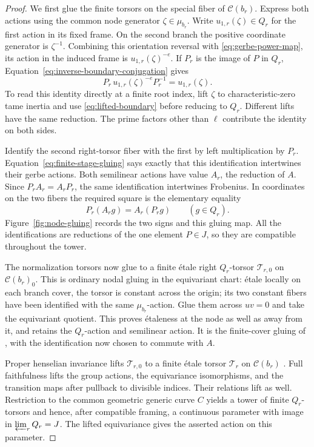 \begin{proof}
We first glue the finite torsors on the special fiber of
$\mathcal C(b_r)$.  Express both actions using the common node
generator $\zeta\in\mu_{b_r}$.  Write $u_{1,r}(\zeta)\in Q_r$ for
the first action in its fixed frame.  On the second branch the
positive coordinate generator is $\zeta^{-1}$.  Combining this
orientation reversal with \eqref{eq:gerbe-power-map}, its action in
the induced frame is $u_{1,r}(\zeta)^{-e}$.  If $P_r$ is the image
of $P$ in $Q_r$, Equation~\eqref{eq:inverse-boundary-conjugation}
gives
\begin{equation}\label{eq:finite-stage-gluing}
       P_r\,u_{1,r}(\zeta)^{-e}P_r^{-1}=u_{1,r}(\zeta).
\end{equation}
To read this identity directly at a finite root index, lift
$\zeta$ to characteristic-zero tame inertia and use
\eqref{eq:lifted-boundary} before reducing to $Q_r$.  Different
lifts have the same reduction.  The prime factors other than $\ell$
contribute the identity on both sides.

Identify the second right-torsor fiber with the first by left
multiplication by $P_r$.  Equation~\eqref{eq:finite-stage-gluing}
says exactly that this identification intertwines their gerbe
actions.  Both semilinear actions have value $A_r$, the reduction of
$A$.  Since $P_rA_r=A_rP_r$, the same identification intertwines
Frobenius.  In coordinates on the two fibers the required square
is the elementary equality
\[
                P_r(A_rg)=A_r(P_rg)\qquad(g\in Q_r).
\]
Figure~\ref{fig:node-gluing} records the two signs and this gluing
map.  All the identifications are reductions of the one element
$P\in J$, so they are compatible throughout the tower.



The normalization torsors now glue to a finite \'etale right
$Q_r$-torsor $\mathcal T_{r,0}$ on $\mathcal C(b_r)_0$.  This is
ordinary nodal gluing in the equivariant chart: \'etale locally on
each branch cover, the torsor is constant across the origin; its
two constant fibers have been identified with the same
$\mu_{b_r}$-action.  Glue them across $uv=0$ and take the
equivariant quotient.  This proves \'etaleness at the node as well
as away from it, and retains the $Q_r$-action and semilinear action.
It is the finite-cover gluing of \cite[Section~8.3]{CT}, with the
identification now chosen to commute with $A$.

Proper henselian invariance lifts $\mathcal T_{r,0}$ to a finite
\'etale torsor $\mathcal T_r$ on $\mathcal C(b_r)$
\cite[Theorem~4.5]{Rydh}.  Full faithfulness lifts the group actions,
the equivariance isomorphisms, and the transition maps after pullback
to divisible indices.  Their relations lift as well.  Restriction
to the common geometric generic curve $C$ yields a tower of finite
$Q_r$-torsors and hence, after compatible framing, a continuous
parameter with image in
$\varprojlim_r Q_r=J$.  The lifted equivariance gives the asserted
action on this parameter.


\end{proof}
